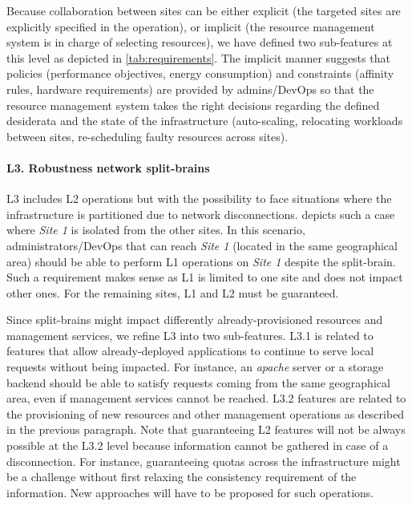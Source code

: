 Because collaboration between sites can be either explicit (\ie the
targeted sites are explicitly specified in the operation), or implicit
(\ie the resource management system is in charge of selecting
resources), we have defined two sub-features at this level as depicted in \cref{tab:requirements}. 
The implicit
manner suggests that policies (\eg performance objectives, energy
consumption) and constraints (\eg affinity rules, hardware requirements) are
provided by admins/DevOps so that the resource management system takes the
right decisions regarding the defined desiderata and the state of the
infrastructure (\eg auto-scaling, relocating workloads between sites,
re-scheduling faulty resources across sites).

\paragraph{L3. Robustness \wrt network split-brains}
L3 includes L2 operations but with the possibility to face situations
where the infrastructure is partitioned due to network disconnections.
%
 depicts such a case where \emph{Site 1} is isolated
from the other sites. In this scenario, administrators/DevOps that can reach \emph{Site
1} (\ie located in the same geographical area) should be able to perform L1
operations on \emph{Site 1} despite the split-brain. Such a requirement
makes sense as L1 is limited to one site and does not impact other ones.
%
For the remaining sites, L1
and L2 must be guaranteed.

Since split-brains might impact differently already-provisioned resources and
management services, we refine L3 into two sub-features. L3.1 is
related to features that allow already-deployed applications to continue to
serve local requests without being impacted. For instance, an \emph{apache}
server or a storage backend should be able to satisfy requests coming from the
same geographical area, even if management services cannot be reached. L3.2
features are related to the provisioning of new resources and other management
operations as described in the previous paragraph.
%
Note that guaranteeing L2 features will not be always possible at the L3.2
level because information cannot be gathered in case of a disconnection. For
instance, guaranteeing quotas across the infrastructure might be a challenge %
without first relaxing the consistency requirement of the information. New approaches will have
to be proposed for such operations.

